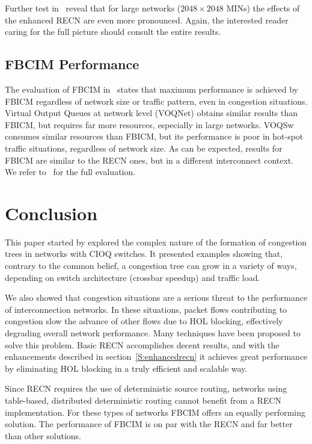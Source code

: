 \documentclass[12pt]{article}
\begin{document}
Further test in~\cite{paper2} reveal that for large networks (${2048 \times 2048}$ MINs) the effects of the enhanced RECN are even more pronounced. Again, the interested reader caring for the full picture should consult the entire results.

\subsection{FBCIM Performance}\label{S:fbcim_perf}

The evaluation of FBCIM in~\cite{paper3} states that maximum performance is achieved by FBICM regardless of network size or traffic pattern, even in congestion situations. Virtual Output Queues at network level (VOQNet) obtains similar results than FBICM, but requires far more resources, especially in large networks. VOQSw consumes similar resources than FBICM, but its performance is poor in hot-spot traffic situations, regardless of network size. As can be expected, results for FBICM are similar to the RECN ones, but in a different interconnect context. We refer to~\cite{paper3} for the full evaluation.

\section{Conclusion}\label{S:conclusion}

This paper started by explored the complex nature of the formation of congestion trees in networks with CIOQ switches. It presented examples showing that, contrary to the common belief, a congestion tree can grow in a variety of ways, depending on switch architecture (crossbar speedup) and traffic load. 

We also showed that congestion situations are a serious threat to the performance of interconnection networks. In these situations, packet flows contributing to congestion slow the advance of other flows due to HOL blocking, effectively degrading overall network performance. Many techniques have been proposed to solve this problem. Basic RECN accomplishes decent results, and with the enhancements described in section~\ref{S:enhancedrecn} it achieves great performance by eliminating HOL blocking in a truly efficient and scalable way. 

Since RECN requires the use of deterministic source routing, networks using table-based, distributed deterministic routing cannot benefit from a RECN implementation. For these types of networks FBCIM offers an equally performing solution. The performance of FBCIM is on par with the RECN and far better than other solutions. 
\end{document}
